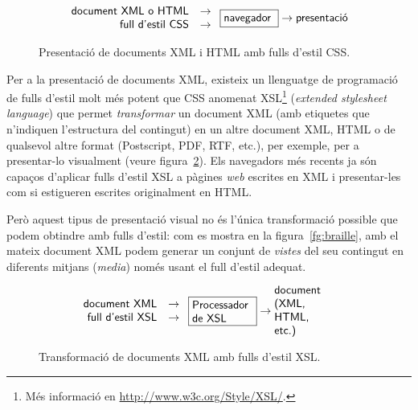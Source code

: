 \begin{figure}
$$
\left.
\begin{array}{rcl}
\mbox{\textsf{document XML o HTML}} & 
\to \\
\mbox{\textsf{full d'estil CSS}} &\to 
 \\
\end{array}
\right.
\mbox{\framebox{\parbox{1.6cm}{\textsf{navegador}}}}
\to \mbox{\parbox{1.8cm}{\textsf{presentació}}}
$$
  

  \caption{Presentació de documents XML i HTML amb fulls d'estil CSS.}
  \label{fg:CSS}
\end{figure}


Per a la presentació de documents XML, existeix un llenguatge de
programació de fulls d'estil molt més potent que CSS anomenat 
XSL\footnote{Més
  informació en \url{http://www.w3c.org/Style/XSL/}.}
(\emph{extended stylesheet language}) que permet \emph{transformar} un
document XML (amb etiquetes que n'indiquen l'estructura del contingut)
en un altre document XML, HTML o de qualsevol altre format
(Postscript, PDF, RTF, etc.), per exemple, per a presentar-lo
visualment (veure figura~\ref{fg:XSL}).  
Els navegadors més recents ja
són capaços d'aplicar fulls d'estil XSL a pàgines \emph{web} escrites
en XML i presentar-les com si estigueren escrites originalment en
HTML.


  Però aquest tipus de presentació visual no és l'única transformació
  possible que podem obtindre amb fulls d'estil: com es mostra en la
  figura~\ref{fg:braille}, amb el mateix document XML podem generar un
  conjunt de \emph{vistes} del seu contingut en diferents mitjans
  (\emph{media}) 
  només usant el full d'estil adequat.


\begin{figure}
$$
\left.
\begin{array}{rcl}
\mbox{\textsf{document XML}} & 
\to \\
\mbox{\textsf{full d'estil XSL}} &\to 
 \\
\end{array}
\right.
\mbox{\framebox{\parbox{1.9cm}{\textsf{Processador de XSL}}}}
\to \mbox{\parbox{2.1cm}{\textsf{document (XML, HTML, etc.) }}}
$$
  \caption{Transformació de documents XML amb fulls d'estil XSL.}
  \label{fg:XSL}
\end{figure}

